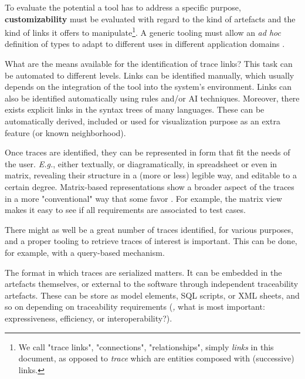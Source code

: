 \begin{descriptioncompact}
    \item[1 - Customization] To evaluate the potential a tool has to address a specific purpose, \textbf{customizability} must be evaluated with regard to the kind of artefacts and the kind of links it offers to manipulate\footnote{We call "trace links", "connections", "relationships", simply \textit{links} in this document, as opposed to \textit{trace} which are entities composed with (successive) links.}. A generic tooling must allow an \textit{ad hoc} definition of types to adapt to different uses in different application domains \cite{maro2016_maintenance_factors_and_guidelines}. 
    
    \item[2 - Identification] What are the means available for the identification of trace links? This task can be automated to different levels. Links can be identified manually, which usually depends on the integration of the tool into the system's environment. Links can also be identified automatically using rules and/or AI techniques.
    Moreover, there exists explicit links in the syntax trees of many languages. These can be automatically derived, included or used for visualization purpose as an extra feature (or known neighborhood). 

    \item[3 - Visualization \& Retrieval] Once traces are identified, they can be represented in form that fit the needs of the user. \textit{E.g.}, either textually, or diagramatically, in spreadsheet or even in matrix, revealing their structure in a (more or less) legible way, and editable to a certain degree.  
    Matrix-based representations show a broader aspect of the traces in a more "conventional" way that some favor \cite{li2013-trace-matrix-analyzer}. For example, the matrix view makes it easy to see if all requirements are associated to test cases.
    
    There might as well be a great number of traces identified, for various purposes, and a proper tooling to retrieve traces of interest is important. This can be done, for example, with a query-based mechanism.

    \item[4 - Persistence \& Edition] The format in which traces are serialized matters. It can be embedded in the artefacts themselves, or external to the software through independent traceability artefacts. These can be store as model elements, SQL scripts, or XML sheets, and so on depending on traceability requirements (\textit{\eg,} what is most important: expressiveness, efficiency, or interoperability?).
    

\end{descriptioncompact}
